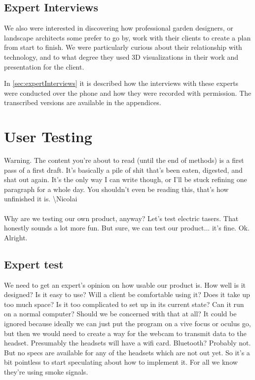\subsection{Expert Interviews}
We also were interested in discovering how professional garden designers, or landscape architects some prefer to go by, work with their clients to create a plan from start to finish. We were particularly curious about their relationship with technology, and to what degree they used 3D visualizations in their work and presentation for the client. 

In \autoref{sec:expertInterviews} it is described how the interviews with these experts were conducted over the phone and how they were recorded with permission. The transcribed versions are available in the appendices. 

\section{User Testing}
Warning. The content you're about to read (until the end of methods) is a first pass of a first draft. It's basically a pile of shit that's been eaten, digested, and shat out again. It's the only way I can write though, or I'll be stuck refining one paragraph for a whole day. You shouldn't even be reading this, that's how unfinished it is. \textbackslash Nicolai \\\\ %
Why are we testing our own product, anyway? Let's test electric tasers. That honestly sounds a lot more fun. But sure, we can test our product... it's fine. Ok. Alright.
\subsection{Expert test}
We need to get an expert's opinion on how usable our product is. How well is it designed? Is it easy to use? Will a client be comfortable using it? Does it take up too much space? Is it too complicated to set up in its current state? Can it run on a normal computer? Should we be concerned with that at all? It could be ignored because ideally we can just put the program on a vive focus or oculus go, but then we would need to create a way for the webcam to transmit data to the headset. Presumably the headsets will have a wifi card. Bluetooth? Probably not. But no specs are available for any of the headsets which are not out yet. So it's a bit pointless to start speculating about how to implement it. For all we know they're using smoke signals.
